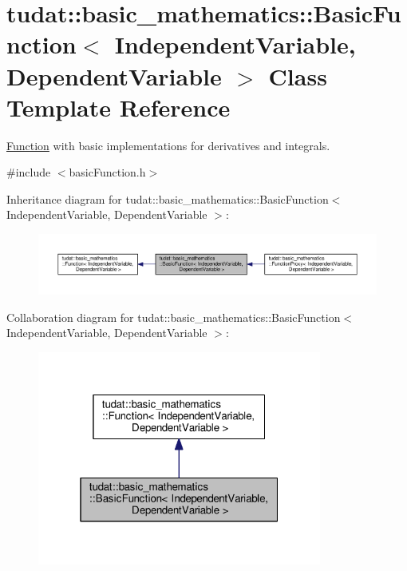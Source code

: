 \hypertarget{classtudat_1_1basic__mathematics_1_1BasicFunction}{}\section{tudat\+:\+:basic\+\_\+mathematics\+:\+:Basic\+Function$<$ Independent\+Variable, Dependent\+Variable $>$ Class Template Reference}
\label{classtudat_1_1basic__mathematics_1_1BasicFunction}


\hyperlink{classtudat_1_1basic__mathematics_1_1Function}{Function} with basic implementations for derivatives and integrals.  




{\ttfamily \#include $<$basic\+Function.\+h$>$}



Inheritance diagram for tudat\+:\+:basic\+\_\+mathematics\+:\+:Basic\+Function$<$ Independent\+Variable, Dependent\+Variable $>$\+:
\nopagebreak
\begin{figure}[H]
\begin{center}
\leavevmode
\includegraphics[width=350pt]{classtudat_1_1basic__mathematics_1_1BasicFunction__inherit__graph}
\end{center}
\end{figure}


Collaboration diagram for tudat\+:\+:basic\+\_\+mathematics\+:\+:Basic\+Function$<$ Independent\+Variable, Dependent\+Variable $>$\+:
\nopagebreak
\begin{figure}[H]
\begin{center}
\leavevmode
\includegraphics[width=265pt]{classtudat_1_1basic__mathematics_1_1BasicFunction__coll__graph}
\end{center}
\end{figure}
